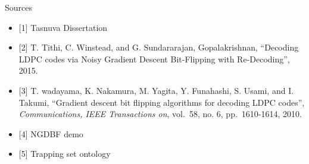 \documentclass[10pt,ignorenonframetext,]{beamer}
\providecommand{\tightlist}{%
  \setlength{\itemsep}{0pt}\setlength{\parskip}{0pt}}
\begin{document}
\begin{frame}{Sources}
\protect\hypertarget{sources}{}
\begin{itemize}[<+->]
\tightlist
\item
  {[}1{]} Tasnuva Dissertation
\item
  {[}2{]} T. Tithi, C. Winstead, and G. Sundararajan, Gopalakrishnan,
  ``Decoding LDPC codes via Noisy Gradient Descent Bit-Flipping with
  Re-Decoding'', 2015.
\item
  {[}3{]} T. wadayama, K. Nakamura, M. Yagita, Y. Funahashi, S. Usami,
  and I. Takumi, ``Gradient descent bit flipping algorithms for decoding
  LDPC codes'', \emph{Communications, IEEE Transactions on}, vol.~58,
  no. 6, pp.~1610-1614, 2010.
\item
  {[}4{]} NGDBF demo
\item
  {[}5{]} Trapping set ontology
\end{itemize}
\end{frame}
\end{document}
